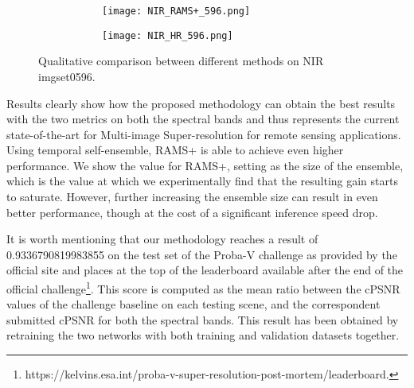 \documentclass[journal]{IEEEtran}
\begin{document}
\begin{figure*}[h!]
\begin{subfigure}{.66\textwidth}
\begin{subfigure}{0.21\linewidth}
      \vspace*{-17pt}\caption*{}
      \vspace*{-8pt}\caption*{\scalebox{0.85}{(48.19 / 0.9899)}}
    \end{subfigure}\hfil \begin{subfigure}{0.21\linewidth}
      \texttt{[image: NIR\_RAMS+\_596.png]}
      \vspace*{-17pt}\caption*{}
      \vspace*{-8pt}\caption*{\scalebox{0.85}{(48.92 / 0.9909)}}
    \end{subfigure}\hfil
    \begin{subfigure}{0.21\linewidth}
      \texttt{[image: NIR\_HR\_596.png]}
      \vspace*{-17pt}\caption*{\scalebox{0.85}{HR}}
      \vspace*{-8pt}\caption*{\scalebox{0.85}{(cPSNR / cSSIM)}}
    \end{subfigure}
\end{subfigure}
\caption{Qualitative comparison between different methods on NIR imgset0596.}
\label{fig:results_NIR}
\end{figure*}
Results clearly show how the proposed methodology can obtain the best results with the two metrics on both the spectral bands and thus represents the current state-of-the-art for Multi-image Super-resolution for remote sensing applications. Using temporal self-ensemble, RAMS+ is able to achieve even higher performance. We show the value for RAMS+, setting  as the size of the ensemble, which is the value at which we experimentally find that the resulting gain starts to saturate. However, further increasing the ensemble size can result in even better performance, though at the cost of a significant inference speed drop.

It is worth mentioning that our methodology reaches a result of 0.9336790819983855 on the test set of the Proba-V challenge as provided by the official site and places at the top of the leaderboard available after the end of the official challenge\footnote{https://kelvins.esa.int/proba-v-super-resolution-post-mortem/leaderboard.}. This score is computed as the mean ratio between the cPSNR values of the challenge baseline on each testing scene, and the correspondent submitted cPSNR for both the spectral bands. This result has been obtained by retraining the two networks with both training and validation datasets together.
\end{document}
